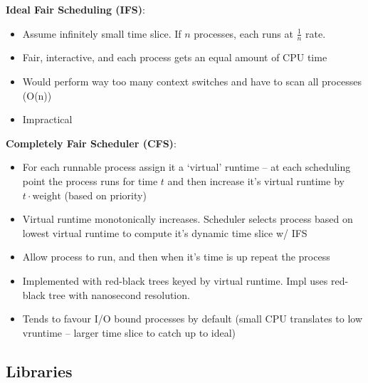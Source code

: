 \documentclass[../notes.tex]{subfiles}
\begin{document}
\begin{definition}
    \textbf{Ideal Fair Scheduling (IFS)}:

    \begin{itemize}
        \item Assume infinitely small time slice. If $ n $ processes, each runs at $ \frac{1}{n} $ rate.
        \item Fair, interactive, and each process gets an equal amount of CPU time
        \item Would perform way too many context switches and have to scan all processes (O(n))
        \item Impractical
    \end{itemize}

\end{definition}


\begin{definition}
    \textbf{Completely Fair Scheduler (CFS)}:

    \begin{itemize}
        \item For each runnable process assign it a `virtual' runtime -- at each scheduling point the process runs for time $ t $ and then increase it's virtual runtime by $ t \cdot  \text{weight} $ (based on priority)
        \item Virtual runtime monotonically increases. Scheduler selects process based on lowest virtual runtime to compute it's dynamic time slice w/ IFS
        \item Allow process to run, and then when it's time is up repeat the process
        \item Implemented with red-black trees keyed by virtual runtime. Impl uses red-black tree with nanosecond resolution.
        \item Tends to favour I/O bound processes by default (small CPU translates to low vruntime -- larger time slice to catch up to ideal)
    \end{itemize}
\end{definition}


\subsection{Libraries}
\end{document}
